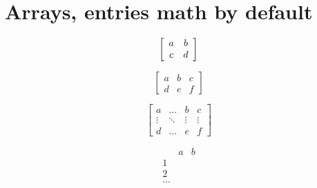 
\section{Arrays, entries math by default}



$$\left[\begin{array}{cc} a & b \\ c & d \end{array}\right]$$

$$\left[\begin{array}{cc|c}
a & b & c \\
d & e & f 
\end{array}\right]$$






$$\left[\begin{array}{ccc|c}
a & \ldots & b & c \\ \hline
\vdots & \ddots & \vdots & \vdots  \\
d & \ldots & e & f
\end{array}\right]$$






$$\begin{array}{c|cc}
& a & b \\ \hline 
1 & & \\ 
2 & & \\ \hline 
\ldots & & 
\end{array}$$